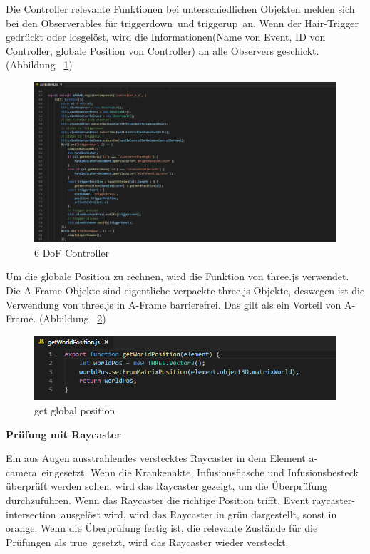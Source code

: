   Die Controller relevante Funktionen bei unterschiedlichen Objekten melden sich bei den Observerables für \glqq triggerdown\grqq\ und \glqq triggerup\grqq\ an. Wenn der Hair-Trigger gedrückt oder losgelöst, wird die Informationen(Name von Event, ID von Controller, globale Position von Controller) an alle Observers geschickt. (Abbildung ~\ref{fig:controller6D})
  
\begin{figure}[ht]
\vspace*{0.3cm}
\centering
\includegraphics[width=\textwidth]{images/controller6D.png}
\caption[6 DoF Controller]{6 DoF Controller}
\label{fig:controller6D} 
\end{figure}
  
  Um die globale Position zu rechnen, wird die Funktion von three.js verwendet. Die A-Frame Objekte sind eigentliche verpackte three.js Objekte, deswegen ist die Verwendung von three.js in A-Frame barrierefrei. Das gilt als ein Vorteil von A-Frame. (Abbildung ~\ref{fig:getWorldPosition})
  
\begin{figure}[ht]
\vspace*{0.3cm}
\centering
\includegraphics[width=\textwidth]{images/getWorldPosition.png}
\caption[get global position]{get global position}
\label{fig:getWorldPosition} 
\end{figure}
  
  \textbf{Prüfung mit Raycaster}
  
  Ein aus Augen ausstrahlendes verstecktes Raycaster in dem Element \glqq a-camera\grqq\ eingesetzt. Wenn die Krankenakte, Infusionsflasche und Infusionsbesteck überprüft werden sollen, wird das Raycaster gezeigt, um die Überprüfung durchzuführen. Wenn das Raycaster die richtige Position trifft, Event \glqq raycaster-intersection\grqq\ ausgelöst wird, wird das Raycaster in grün dargestellt, sonst in orange. Wenn die Überprüfung fertig ist, die relevante Zustände für die Prüfungen als \glqq true\grqq\ gesetzt, wird das Raycaster wieder versteckt.
  
